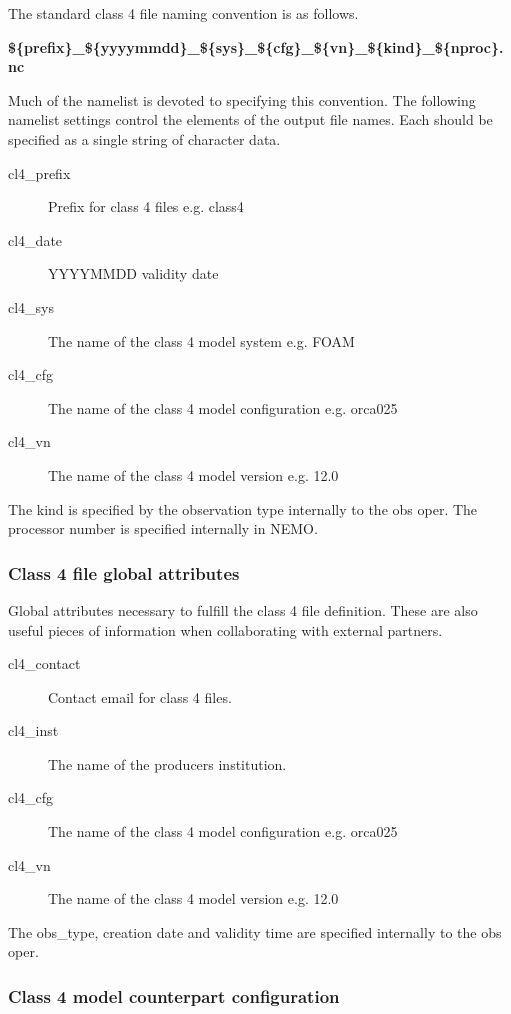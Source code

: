 \documentclass[NEMO_book]{subfiles}
\begin{document}
The standard class 4 file naming convention is as follows.

\noindent
\linebreak
\textbf{\$\{prefix\}\_\$\{yyyymmdd\}\_\$\{sys\}\_\$\{cfg\}\_\$\{vn\}\_\$\{kind\}\_\$\{nproc\}.nc}

\noindent
\linebreak
Much of the namelist is devoted to specifying this convention. The
following namelist settings control the elements of the output
file names. Each should be specified as a single string of character data.

\begin{description}
\item[cl4\_prefix]
Prefix for class 4 files e.g. class4
\item[cl4\_date]
YYYYMMDD validity date
\item[cl4\_sys]
The name of the class 4 model system e.g. FOAM
\item[cl4\_cfg]
The name of the class 4 model configuration e.g. orca025
\item[cl4\_vn]
The name of the class 4 model version e.g. 12.0
\end{description}

\noindent
The kind is specified by the observation type internally to the obs oper. The processor
number is specified internally in NEMO. 

\subsubsection{Class 4 file global attributes}

Global attributes necessary to fulfill the class 4 file definition. These
are also useful pieces of information when collaborating with external
partners.

\begin{description}
\item[cl4\_contact]
Contact email for class 4 files.
\item[cl4\_inst]
The name of the producers institution.
\item[cl4\_cfg]
The name of the class 4 model configuration e.g. orca025
\item[cl4\_vn]
The name of the class 4 model version e.g. 12.0
\end{description}

\noindent
The obs\_type,
creation date and validity time are specified internally to the obs oper.

\subsubsection{Class 4 model counterpart configuration}
\end{document}
